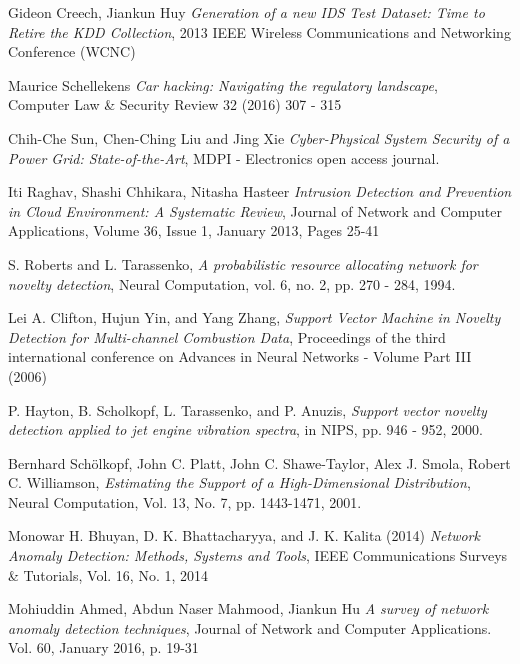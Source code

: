 \documentclass[reqno,openany,12pt]{amsbook}
\begin{document}
\begin{thebibliography}{99}


 Gideon Creech, Jiankun Huy \emph{Generation of a new IDS Test Dataset: Time to Retire the KDD Collection}, 
2013 IEEE Wireless Communications and Networking Conference (WCNC)

 Maurice Schellekens \emph{Car hacking: Navigating the regulatory landscape},\\ Computer Law \& Security Review 32 (2016) 307 - 315

 Chih-Che Sun, Chen-Ching Liu and Jing Xie \emph{Cyber-Physical System Security of a Power Grid: State-of-the-Art}, MDPI - Electronics open access journal.

 Iti Raghav, Shashi Chhikara, Nitasha Hasteer \emph{Intrusion Detection and Prevention in Cloud Environment: A Systematic Review}, Journal of Network and Computer Applications, Volume 36, Issue 1, January 2013, Pages 25-41

 S. Roberts and L. Tarassenko, \emph{A probabilistic resource allocating
network for novelty detection}, Neural Computation, vol. 6, no. 2,
pp. 270 - 284, 1994.

 Lei A. Clifton, Hujun Yin, and Yang Zhang, \emph{Support Vector Machine in Novelty Detection for Multi-channel Combustion Data}, Proceedings of the third international conference on Advances in Neural Networks - Volume Part III (2006)

 P. Hayton, B. Scholkopf, L. Tarassenko, and P. Anuzis, \emph{Support vector novelty detection applied to jet engine vibration spectra}, in NIPS, pp. 946 - 952, 2000.

 	Bernhard Schölkopf, John C. Platt, John C. Shawe-Taylor, Alex J. Smola, Robert C. Williamson, \emph{Estimating the Support of a High-Dimensional Distribution}, Neural Computation, Vol. 13, No. 7, pp. 1443-1471, 2001.


 Monowar H. Bhuyan, D. K. Bhattacharyya, and J. K. Kalita (2014) \emph{Network Anomaly Detection: Methods, Systems and Tools}, IEEE Communications Surveys \& Tutorials, Vol. 16, No. 1, 2014

 Mohiuddin Ahmed, Abdun Naser Mahmood, Jiankun Hu \emph{A survey of network anomaly detection techniques}, Journal of Network and Computer Applications. Vol. 60, January 2016, p. 19-31


\end{thebibliography}
\end{document}
